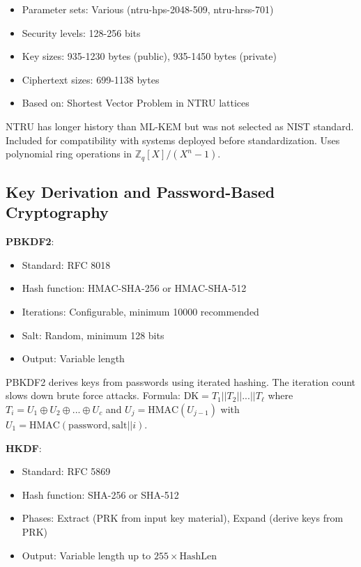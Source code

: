 \begin{itemize}
\item Parameter sets: Various (ntru-hps-2048-509, ntru-hrss-701)
\item Security levels: 128-256 bits
\item Key sizes: 935-1230 bytes (public), 935-1450 bytes (private)
\item Ciphertext sizes: 699-1138 bytes
\item Based on: Shortest Vector Problem in NTRU lattices
\end{itemize}

NTRU has longer history than ML-KEM but was not selected as NIST
standard. Included for compatibility with systems deployed before
standardization. Uses polynomial ring operations in
$\mathbb{Z}_q[X]/(X^n - 1)$.

\subsection{Key Derivation and Password-Based Cryptography}

\textbf{PBKDF2}:

\begin{itemize}
\item Standard: RFC 8018
\item Hash function: HMAC-SHA-256 or HMAC-SHA-512
\item Iterations: Configurable, minimum 10000 recommended
\item Salt: Random, minimum 128 bits
\item Output: Variable length
\end{itemize}

PBKDF2 derives keys from passwords using iterated hashing. The
iteration count slows down brute force attacks. Formula: $\text{DK} =
T_1 || T_2 || ... || T_\ell$ where $T_i = U_1 \oplus U_2 \oplus
... \oplus U_c$ and $U_j = \text{HMAC}(U_{j-1})$ with $U_1 =
\text{HMAC}(\text{password}, \text{salt} || i)$.

\textbf{HKDF}:

\begin{itemize}
\item Standard: RFC 5869
\item Hash function: SHA-256 or SHA-512
\item Phases: Extract (PRK from input key material), Expand (derive
  keys from PRK)
\item Output: Variable length up to $255 \times \text{HashLen}$
\end{itemize}

